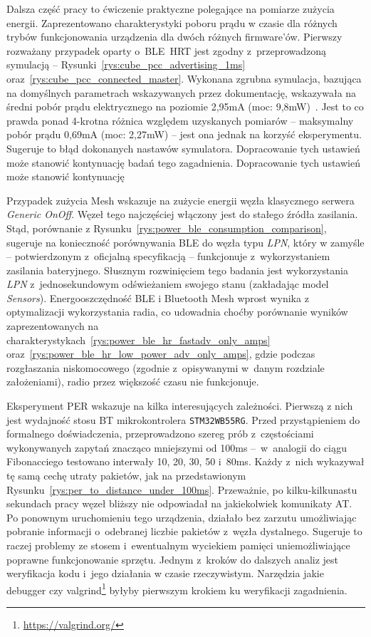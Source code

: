 Dalsza część pracy to ćwiczenie praktyczne polegające na pomiarze zużycia energii. Zaprezentowano
charakterystyki poboru prądu w czasie dla różnych trybów funkcjonowania urządzenia dla dwóch różnych firmware'ów.
Pierwszy rozważany przypadek oparty o~BLE~\gls{HRT} jest zgodny z~przeprowadzoną symulacją -- 
Rysunki~\ref{rys:cube_pcc_advertising_1ms} oraz~\ref{rys:cube_pcc_connected_master}. Wykonana zgrubna symulacja,
bazująca na domyślnych parametrach wskazywanych przez dokumentację,
wskazywała na średni pobór prądu elektrycznego na poziomie 2,95mA (moc: 9,8mW)~\cite{noauthor_um1718_2022}. Jest to co prawda ponad
4-krotna różnica względem uzyskanych pomiarów -- maksymalny pobór prądu 0,69mA (moc: 2,27mW) -- jest ona jednak na korzyść
eksperymentu. Sugeruje to błąd dokonanych nastawów symulatora. Dopracowanie tych ustawień może stanowić kontynuację
badań tego zagadnienia. Dopracowanie tych ustawień może stanowić kontynuację

Przypadek zużycia Mesh wskazuje na zużycie energii węzła klasycznego serwera \textit{Generic OnOff}. Węzeł tego
najczęściej włączony jest do stałego źródła zasilania. Stąd, porównanie z Rysunku~\ref{rys:power_ble_consumption_comparison},
sugeruje na konieczność porównywania BLE do węzła typu \textit{LPN}, który w zamyśle -- potwierdzonym z~oficjalną specyfikacją
-- funkcjonuje z~wykorzystaniem zasilania bateryjnego. Słusznym rozwinięciem tego badania jest wykorzystania
\textit{LPN} z~jednosekundowym odświeżaniem swojego stanu (zakładając model \textit{Sensors}). Energooszczędność
BLE i Bluetooth Mesh wprost wynika z optymalizacji wykorzystania radia, co udowadnia choćby porównanie
wyników zaprezentowanych na charakterystykach~\ref{rys:power_ble_hr_fastadv_only_amps} oraz~\ref{rys:power_ble_hr_low_power_adv_only_amps},
gdzie podczas rozgłaszania niskomocowego (zgodnie z~opisywanymi w~danym rozdziale założeniami), radio przez większość
czasu nie funkcjonuje.

Eksperyment PER wskazuje na kilka interesujących zależności. Pierwszą z nich jest wydajność stosu \gls{BT} mikrokontrolera \texttt{STM32WB55RG}.
Przed przystąpieniem do formalnego doświadczenia, przeprowadzono szereg prób z~częstościami wykonywanych zapytań
znacząco mniejszymi od 100ms --~w~analogii do ciągu Fibonacciego testowano interwały 10, 20, 30, 50 i~80ms. Każdy z~nich wykazywał
tę samą cechę utraty pakietów, jak na przedstawionym Rysunku~\ref{rys:per_to_distance_under_100ms}. Przeważnie,
po kilku-kilkunastu sekundach pracy węzeł bliższy nie odpowiadał na jakiekolwiek komunikaty AT. Po ponownym uruchomieniu tego urządzenia,
działało bez zarzutu umożliwiając pobranie informacji o~odebranej liczbie pakietów z~węzła dystalnego.
Sugeruje to raczej problemy ze stosem i~ewentualnym wyciekiem pamięci uniemożliwiające poprawne funkcjonowanie sprzętu.
Jednym z~kroków do dalszych analiz jest weryfikacja kodu i~jego działania w czasie rzeczywistym. Narzędzia jakie debugger
czy valgrind\footnote{\url{https://valgrind.org/}} byłyby pierwszym krokiem ku weryfikacji zagadnienia.

